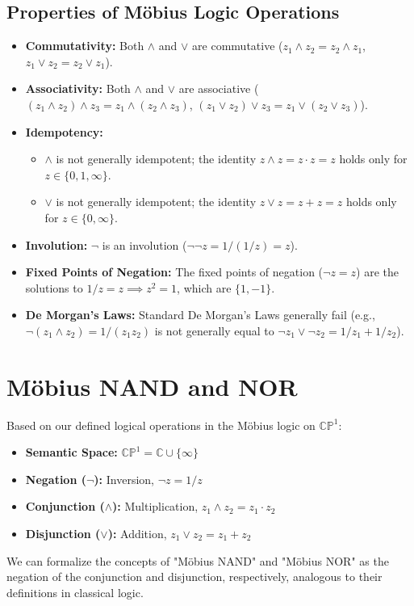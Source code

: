 	\subsection{Properties of Möbius Logic Operations}
	\begin{itemize}
		\item \textbf{Commutativity:} Both \(\wedge\) and \(\vee\) are commutative (\(z_1 \wedge z_2 = z_2 \wedge z_1\), \(z_1 \vee z_2 = z_2 \vee z_1\)).
		\item \textbf{Associativity:} Both \(\wedge\) and \(\vee\) are associative (\((z_1 \wedge z_2) \wedge z_3 = z_1 \wedge (z_2 \wedge z_3)\), \((z_1 \vee z_2) \vee z_3 = z_1 \vee (z_2 \vee z_3)\)).
		\item \textbf{Idempotency:}
		\begin{itemize}
			\item \(\wedge\) is not generally idempotent; the identity \(z \wedge z = z \cdot z = z\) holds only for \(z \in \{0, 1, \infty\}\).
			\item \(\vee\) is not generally idempotent; the identity \(z \vee z = z + z = z\) holds only for \(z \in \{0, \infty\}\).
		\end{itemize}
		\item \textbf{Involution:} \(\neg\) is an involution (\(\neg \neg z = 1/(1/z) = z\)).
		\item \textbf{Fixed Points of Negation:} The fixed points of negation (\(\neg z = z\)) are the solutions to \(1/z = z \implies z^2 = 1\), which are \(\{1, -1\}\).
		\item \textbf{De Morgan's Laws:} Standard De Morgan's Laws generally fail (e.g., \(\neg(z_1 \wedge z_2) = 1/(z_1 z_2)\) is not generally equal to \(\neg z_1 \vee \neg z_2 = 1/z_1 + 1/z_2\)).
	\end{itemize}
	
	\section{Möbius NAND and NOR}

	Based on our defined logical operations in the M\"{o}bius logic on $\mathbb{CP}^1$:
	\begin{itemize}
		\item \textbf{Semantic Space:} $\mathbb{CP}^1 = \mathbb{C} \cup \{\infty\}$
		\item \textbf{Negation ($\neg$):} Inversion, $\neg z = 1/z$
		\item \textbf{Conjunction ($\wedge$):} Multiplication, $z_1 \wedge z_2 = z_1 \cdot z_2$
		\item \textbf{Disjunction ($\vee$):} Addition, $z_1 \vee z_2 = z_1 + z_2$
	\end{itemize}
	We can formalize the concepts of "M\"{o}bius NAND" and "M\"{o}bius NOR" as the negation of the conjunction and disjunction, respectively, analogous to their definitions in classical logic.

